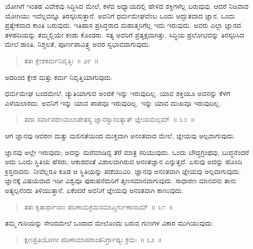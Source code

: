 ಯೋಗಿಗೆ ಇಂತಹ ವಿವೇಕವು ಸಿದ್ಧಿಸಿದ ಮೇಲೆ, ಕಳೆದ ಅಧ್ಯಾಯದಲ್ಲಿ ಹೇಳಿದ ಶಕ್ತಿಗಳೆಲ್ಲ ಬರುವುವು. ಆದರೆ ನಿಜವಾದ ಯೋಗಿಯು ಇವೆಲ್ಲವನ್ನೂ ತಿರಸ್ಕರಿಸುತ್ತಾನೆ. ಅವನಿಗೆ ಧರ್ಮಮೇಘವೆಂಬ ಒಂದು ಅದ್ಭುತವಾದ ಜ್ಞಾನ, ಒಂದು ಪ್ರತ್ಯೇಕವಾದ ಕಾಂತಿ ಬರುವುದು. ಇತಿಹಾಸ ಪ್ರಸಿದ್ಧರಾದ ಮಹಾತ್ಮರಿಗೆಲ್ಲ ಇದು ಇರುವುದು. ಅವರು ಎಲ್ಲಾ ಜ್ಞಾನದ ತಳಹದಿಯನ್ನು ತಮ್ಮಲ್ಲಿಯೇ ಕಂಡು ಕೊಂಡರು. ಸತ್ಯ ಅವರಿಗೆ ಪ್ರತ್ಯಕ್ಷವಾಗಿತ್ತು. ಸಿದ್ಧಿಯ ಪ್ರಲೋಭವನ್ನು ತಿರಸ್ಕರಿಸಿದ ಮೇಲೆ ಶಾಂತಿ, ನಿಶ್ಚಲತೆ, ಪೂರ್ಣಪಾವಿತ್ರ್ಯ ಅವರ ಸ್ವಭಾವವಾಗುವುದು. 

\vspace{-0.3cm}

\begin{verse}
ತತಃ ಕ್ಲೇಶಕರ್ಮನಿವೃತ್ತಿಃ~॥ ೨೯~॥
\end{verse}

\vspace{-0.3cm}

ಅದರಿಂದ ಕ್ಲೇಶ ಮತ್ತು ಕರ್ಮ ನಿವೃತ್ತಿಯಾಗುವುದು. 

ಧರ್ಮಮೇಘ ಬಂದಮೇಲೆ, ಚ್ಯುತಿಯಾಗುವ ಅಂಜಿಕೆ ಇನ್ನು ಇರುವುದಿಲ್ಲ. ಯಾವ ಶಕ್ತಿಯೂ ಅವನನ್ನು ಕೆಳಗೆ ಎಳೆಯಲಾರದು. ಅವನಿಗೆ ಇನ್ನು ಯಾವ ಪಾಪವೂ ಇರುವುದಿಲ್ಲ. ಇನ್ನು ಯಾವ ದುಃಖವೂ ಇರುವುದಿಲ್ಲ. 

\vspace{-0.3cm}

\begin{verse}
ತದಾ ಸರ್ವಾವರಣಮಲಾಪೇತಸ್ಯ ಜ್ಞಾನಸ್ಯಾನಂತ್ಯಾತ್​  ಜ್ಞೇಯಮಲ್ಪಮ್​~॥ ೩೦~॥
\end{verse}

\vspace{-0.3cm}

ಆಗ ಜ್ಞಾನವು ಆವರಣ ಮತ್ತು ಮಲಿನತೆಯಿಂದ ಮುಕ್ತವಾಗಿ ಅನಂತವಾದ ಮೇಲೆ, ಜ್ಞೇಯವು ಅಲ್ಪವಾಗುವುದು. 

ಜ್ಞಾನವು ಅಲ್ಲೇ ಇರುವುದು; ಅದನ್ನು ಮರೆಮಾಡಿದ್ದ ತೆರೆ ಮಾತ್ರ ಸರಿಯುವುದು. ಒಂದು ಬೌದ್ಧಗ್ರಂಥವು, ಬುದ್ಧನೆಂದರೆ ಅದು ಒಂದು ಸ್ಥಿತಿಯ ಹೆಸರು, ಆಕಾಶದಂತೆ ವಿಶಾಲವಾಗಿರುವ ಅನಂತಜ್ಞಾನ ಎನ್ನುತ್ತದೆ. ಏಸುವು ಅದನ್ನು ಹೊಂದಿ ಕ್ರಿಸ್ತನಾದನು. ನೀವೆಲ್ಲರೂ ಕೂಡ ಆ ಸ್ಥಿತಿಯನ್ನು ಪಡೆಯುವಿರಿ. ಜ್ಞಾನವು ಅನಂತವಾಗಿ ಜ್ಞೇಯವು ಅಲ್ಪವಾಗುವುದು. ಜ್ಞಾನಕ್ಕೆ ವಿಷಯವಾದ ಇಡೀ ವಿಶ್ವವೂ ಪುರುಷನೆದುರಿಗೆ ತೃಣಸಮಾನವಾಗುವುದು. ಸಾಧಾರಣ ಮಾನವನು ತಾನು ಅತ್ಯಲ್ಪನೆಂದು ತಿಳಿಯುತ್ತಾನೆ. ಏಕೆಂದರೆ ಅವನಿಗೆ ಜ್ಞೇಯವು ಅನಂತವಾಗಿ ಕಾಣುವುದು.

\begin{verse}
ತತಃ ಕೃತಾರ್ಥಾನಾಂ ಪರಿಣಾಮಕ್ರಮಸಮಾಪ್ತಿರ್ಗುಣಾನಾಮ್​~॥ ೩೧~॥
\end{verse}

\vspace{-0.3cm}

ತಮ್ಮ ಗುರಿಯನ್ನು ಸೇರಿದಮೇಲೆ ಒಂದಾದ ಮೇಲೊಂದು ಬರುವ ಗುಣಗಳ ವಿಕಾರ ಮುಗಿಯುವುದು.

\begin{verse}
ಕ್ಷಣಪ್ರತಿಯೋಗೀ ಪರಿಣಾಮಾಪರಾಂತನಿರ್ಗ್ರಾಹ್ಯಃ ಕ್ರಮಃ~॥ ೩೨~॥
\end{verse}

